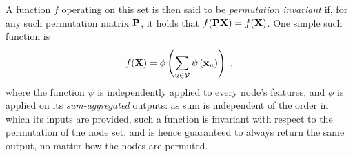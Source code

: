 
 
 


A function $f$ operating on this set is then said to be \emph{permutation invariant} if, for any such permutation matrix ${\bf P}$, it holds that $f({\bf P}{\bf X}) = f({\bf X})$. One simple such function is 
\begin{equation}
\label{eq:basicinv}
    f({\bf X}) = \phi\left(\sum_{u\in {\mathcal{V}}} \psi\left(\mathbf{ x}_u\right)\right)~,
\end{equation}
where the function $\psi$ is independently applied to every node's features, and $\phi$ is applied on its \emph{sum-aggregated} outputs: as sum is independent of the order in which its inputs are provided, such a function is  invariant with respect to the permutation of the node set, and is hence guaranteed to always return the same output, no matter how the nodes are permuted.


 



